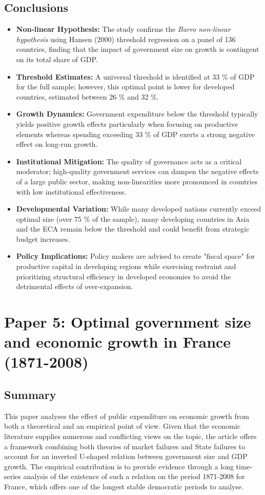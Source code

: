 \documentclass[10pt, oneside]{article}
\begin{document}
\subsection{Conclusions}
\begin{itemize}
	\item \textbf{Non-linear Hypothesis:} The study confirms the \textit{Barro non-linear hypothesis} using Hansen (2000) threshold regression on a panel of 136 countries, finding that the impact of government size on growth is contingent on its total share of GDP.
	\item \textbf{Threshold Estimates:} A universal threshold is identified at 33 \% of GDP for the full sample; however, this optimal point is lower for developed countries, estimated between 26 \% and 32 \%.
	\item \textbf{Growth Dynamics:} Government expenditure below the threshold typically yields positive growth effects particularly when focusing on productive elements whereas spending exceeding 33 \% of GDP exerts a strong negative effect on long-run growth.
	\item \textbf{Institutional Mitigation:} The quality of governance acts as a critical moderator; high-quality government services can dampen the negative effects of a large public sector, making non-linearities more pronounced in countries with low institutional effectiveness.
	\item \textbf{Developmental Variation:} While many developed nations currently exceed optimal size (over 75 \% of the sample), many developing countries in Asia and the ECA remain below the threshold and could benefit from strategic budget increases.
	\item \textbf{Policy Implications:} Policy makers are advised to create "fiscal space" for productive capital in developing regions while exercising restraint and prioritizing structural efficiency in developed economies to avoid the detrimental effects of over-expansion.
\end{itemize}

\section{Paper 5: Optimal government size and economic growth in France (1871-2008)}

\subsection{Summary}
This paper analyses the effect of public expenditure on economic growth from both a theoretical
and an empirical point of view. Given that the economic literature supplies numerous and conflicting views
on the topic, the article offers a framework combining both theories of market failures and State failures to
account for an inverted U-shaped relation between government size and GDP growth. The empirical
contribution is to provide evidence through a long time-series analysis of the existence of such a relation on
the period 1871-2008 for France, which offers one of the longest stable democratic periods to analyse. \cite{Facchini2011OptimalGS}
\end{document}
